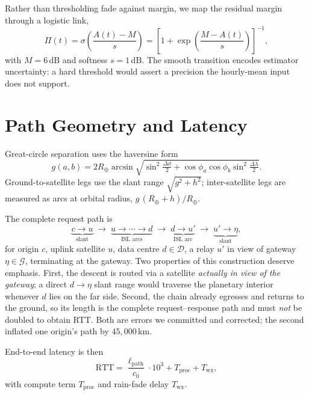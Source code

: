 \documentclass[10pt,twocolumn]{article}
\newcommand{\km}{\,\mathrm{km}}
\newcommand{\dB}{\,\mathrm{dB}}
\newcommand{\Gset}{\mathcal{G}}
\newcommand{\Dset}{\mathcal{D}}
\begin{document}
Rather than thresholding fade against margin, we map the residual margin through
a logistic link,
\begin{equation}
\Pi(t)=\sigma\!\left(\frac{A(t)-M}{s}\right)
=\left[1+\exp\!\left(\frac{M-A(t)}{s}\right)\right]^{-1},
\label{eq:outage}
\end{equation}
with $M=6\dB$ and softness $s=1\dB$. The smooth transition encodes estimator
uncertainty: a hard threshold would assert a precision the hourly-mean input
does not support.

\section{Path Geometry and Latency}

Great-circle separation uses the haversine form
\begin{equation}
g(a,b)=2R_{\oplus}\arcsin\!\sqrt{\sin^{2}\tfrac{\Delta\phi}{2}
+\cos\phi_{a}\cos\phi_{b}\sin^{2}\tfrac{\Delta\lambda}{2}}.
\end{equation}
Ground-to-satellite legs use the slant range
$\sqrt{g^{2}+h^{2}}$; inter-satellite legs are measured as arcs at orbital
radius, $g\,(R_{\oplus}+h)/R_{\oplus}$.

The complete request path is
\begin{equation}
\underbrace{c \to u}_{\text{slant}} \;\to\;
\underbrace{u \to \cdots \to d}_{\text{ISL arcs}} \;\to\;
\underbrace{d \to u'}_{\text{ISL arc}} \;\to\;
\underbrace{u' \to \eta}_{\text{slant}},
\end{equation}
for origin $c$, uplink satellite $u$, data centre $d\in\Dset$, a relay $u'$ in
view of gateway $\eta\in\Gset$, terminating at the gateway. Two properties of
this construction deserve emphasis. First, the descent is routed via a satellite
\emph{actually in view of the gateway}; a direct $d\to\eta$ slant range would
traverse the planetary interior whenever $d$ lies on the far side. Second, the
chain already egresses and returns to the ground, so its length is the complete
request--response path and must \emph{not} be doubled to obtain RTT. Both are
errors we committed and corrected; the second inflated one origin's path by
$45{,}000\km$.

End-to-end latency is then
\begin{equation}
\mathrm{RTT}=\frac{\ell_{\mathrm{path}}}{c_{0}}\cdot10^{3}
+ T_{\mathrm{proc}} + T_{\mathrm{wx}},
\end{equation}
with compute term $T_{\mathrm{proc}}$ and rain-fade delay $T_{\mathrm{wx}}$.
\end{document}
